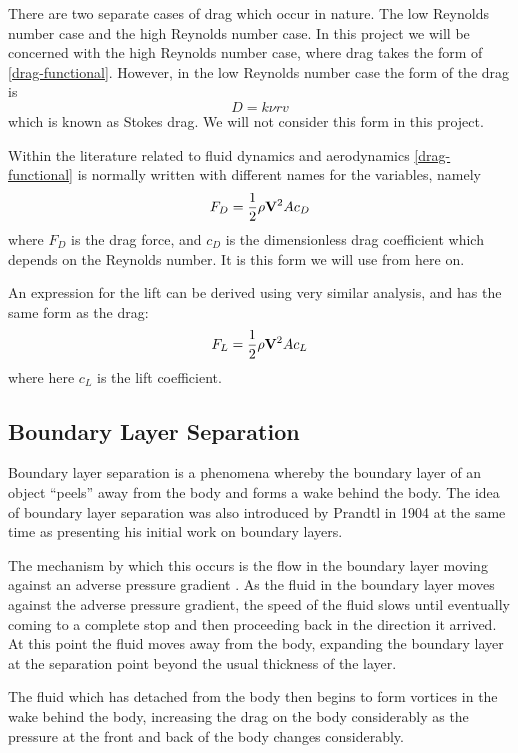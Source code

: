 There are two separate cases of drag which occur in nature. The low Reynolds number case and the
high Reynolds number case. In this project we will be concerned with the high Reynolds number case,
where drag takes the form of \eqref{drag-functional}. However, in the low Reynolds number case the form
of the drag is \citet{0143-0807-31-4-019}
\begin{equation}
D = k \nu r v
\end{equation}
which is known as Stokes drag. We will not consider this form in this project.

Within the literature related to fluid dynamics and aerodynamics \eqref{drag-functional} is normally written
with different names for the variables, namely 
\begin{equation} \label{drag}
F_{D} = \frac{1}{2} \rho \mathbf{V}^2 A c_{D}
\end{equation}
where $F_{D}$ is the drag force, and $c_{D}$ is the dimensionless drag coefficient which depends on 
the Reynolds number. It is this form
we will use from here on. 

An expression for the lift can be derived using very similar analysis, and has the same form as the
drag:
\begin{equation} \label{lift}
F_{L} = \frac{1}{2} \rho \mathbf{V}^2 A c_{L}
\end{equation}
where here $c_{L}$ is the lift coefficient.

\subsection{Boundary Layer Separation}

Boundary layer separation is a phenomena whereby the boundary layer of an object ``peels'' away from
the body and forms a wake behind the body. The idea of boundary layer separation was also introduced
by Prandtl in 1904 at the same time as presenting his initial work on boundary layers.

The mechanism by which this occurs is the flow in the 
boundary layer moving against an adverse pressure gradient \citet{FLM:374505}. As the fluid in the boundary layer moves
against the adverse pressure gradient, the speed of the fluid slows until eventually coming to a
complete stop and then proceeding back in the direction it arrived. At this point the fluid moves away
from the body, expanding the boundary layer at the separation
point beyond the usual thickness of the layer.

The fluid which has detached from the body then begins to form vortices in the wake behind the body,
increasing the drag on the body considerably as the pressure at the front and back of the body changes
considerably.

